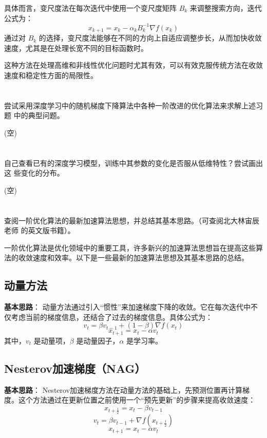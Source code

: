 \documentclass[a4paper]{article}
\begin{document}
具体而言，变尺度法在每次迭代中使用一个变尺度矩阵 $B_k$ 来调整搜索方向，迭代公式为：
\[
x_{k+1} = x_k - \alpha_k B_k^{-1} \nabla f(x_k)
\]
通过对 $B_k$ 的选择，变尺度法能够在不同的方向上自适应调整步长，从而加快收敛速度，尤其是在处理长宽不同的目标函数时。

这种方法在处理高维和非线性优化问题时尤其有效，可以有效克服传统方法在收敛速度和稳定性方面的局限性。


\section{}

尝试采用深度学习中的随机梯度下降算法中各种一阶改进的优化算法来求解上述习题
中的典型问题。

(空)

\section{}

自己查看已有的深度学习模型，训练中其参数的变化是否服从低维特性？尝试画出这
些变化的分布。

(空)
\section{}

查阅一阶优化算法的最新加速算法思想，并总结其基本思路。（可查阅北大林宙辰老师
的英文版书籍）。

一阶优化算法是优化领域中的重要工具，许多新兴的加速算法思想旨在提高这些算法的收敛速度和效率。以下是一些最新的加速算法思想及其基本思路的总结。

\subsection{动量方法}

\textbf{基本思路}：
动量方法通过引入“惯性”来加速梯度下降的收敛。它在每次迭代中不仅考虑当前的梯度信息，还结合了过去的梯度信息。具体公式为：
\[
v_t = \beta v_{t-1} + (1 - \beta) \nabla f(x_t)
\]
\[
x_{t+1} = x_t - \alpha v_t
\]
其中，$v_t$ 是动量项，$\beta$ 是动量因子，$\alpha$ 是学习率。

\subsection{Nesterov加速梯度（NAG）}

\textbf{基本思路}：
Nesterov加速梯度方法在动量方法的基础上，先预测位置再计算梯度。这个方法通过在更新位置之前使用一个“预先更新”的步骤来提高收敛速度：
\[
x_{t+\frac{1}{2}} = x_t - \beta v_{t-1}
\]
\[
v_t = \beta v_{t-1} + \nabla f(x_{t+\frac{1}{2}})
\]
\[
x_{t+1} = x_t - \alpha v_t
\]
\end{document}
